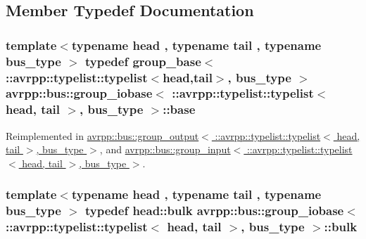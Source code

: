 \subsection{Member Typedef Documentation}
\hypertarget{structavrpp_1_1bus_1_1group__iobase_3_01_1_1avrpp_1_1typelist_1_1typelist_3_01head_00_01tail_01_4_00_01bus__type_01_4_a3c2a3f7afa6c666e7a625d027e9e89e0}{
\subsubsection[{base}]{\setlength{\rightskip}{0pt plus 5cm}template$<$typename head , typename tail , typename bus\_\-type $>$ typedef group\_\-base$<$ ::{\bf avrpp::typelist::typelist}$<$head,tail$>$, bus\_\-type $>$ avrpp::bus::group\_\-iobase$<$ ::{\bf avrpp::typelist::typelist}$<$ head, tail $>$, bus\_\-type $>$::{\bf base}}}
\label{structavrpp_1_1bus_1_1group__iobase_3_01_1_1avrpp_1_1typelist_1_1typelist_3_01head_00_01tail_01_4_00_01bus__type_01_4_a3c2a3f7afa6c666e7a625d027e9e89e0}


Reimplemented in \hyperlink{structavrpp_1_1bus_1_1group__output_3_01_1_1avrpp_1_1typelist_1_1typelist_3_01head_00_01tail_01_4_00_01bus__type_01_4_a4c3ea4f3290eb5dc3b45e83634820404}{avrpp::bus::group\_\-output$<$ ::avrpp::typelist::typelist$<$ head, tail $>$, bus\_\-type $>$}, and \hyperlink{structavrpp_1_1bus_1_1group__input_3_01_1_1avrpp_1_1typelist_1_1typelist_3_01head_00_01tail_01_4_00_01bus__type_01_4_a758a4f561ac4b89692ba64751aaf2afb}{avrpp::bus::group\_\-input$<$ ::avrpp::typelist::typelist$<$ head, tail $>$, bus\_\-type $>$}.

\hypertarget{structavrpp_1_1bus_1_1group__iobase_3_01_1_1avrpp_1_1typelist_1_1typelist_3_01head_00_01tail_01_4_00_01bus__type_01_4_afef5ea0856142cfafc467b0c45a86505}{
\subsubsection[{bulk}]{\setlength{\rightskip}{0pt plus 5cm}template$<$typename head , typename tail , typename bus\_\-type $>$ typedef head::bulk avrpp::bus::group\_\-iobase$<$ ::{\bf avrpp::typelist::typelist}$<$ head, tail $>$, bus\_\-type $>$::{\bf bulk}}}
\label{structavrpp_1_1bus_1_1group__iobase_3_01_1_1avrpp_1_1typelist_1_1typelist_3_01head_00_01tail_01_4_00_01bus__type_01_4_afef5ea0856142cfafc467b0c45a86505}


